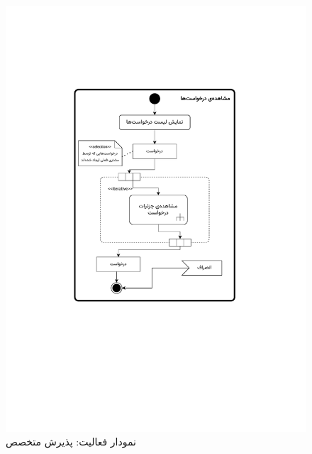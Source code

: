 \begin{figure}[ht!]
	\centering
	\includegraphics[scale=0.8, page=6]{figs/OOD-activity11-20.pdf}
	\caption{نمودار فعالیت: پذیرش متخصص}
\end{figure}
\FloatBarrier
\newpage

